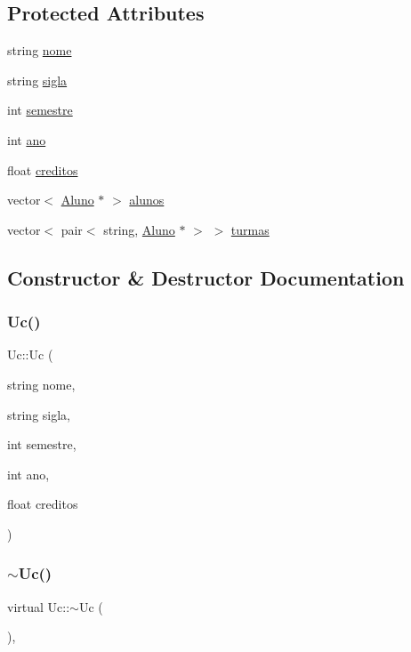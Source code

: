 \subsection*{Protected Attributes}
\begin{DoxyCompactItemize}
\item 
string \hyperlink{class_uc_af2971baa3ea283ba5fec29170de3fbe9}{nome}
\item 
string \hyperlink{class_uc_a5d6fb389c3634d6c4f4b92877e4e0e39}{sigla}
\item 
int \hyperlink{class_uc_a5e91075b035d68f536d35683c50c9bae}{semestre}
\item 
int \hyperlink{class_uc_aefaa6dc015733603451294d3e2efaa83}{ano}
\item 
float \hyperlink{class_uc_a0d64adeb7bc81560097dc7c6e9e2dff1}{creditos}
\item 
vector$<$ \hyperlink{class_aluno}{Aluno} $\ast$ $>$ \hyperlink{class_uc_a058e545b7e0dbbf16f6af64bb47361eb}{alunos}
\item 
vector$<$ pair$<$ string, \hyperlink{class_aluno}{Aluno} $\ast$ $>$ $>$ \hyperlink{class_uc_af83cbf0a6dd978ff629bfc34d5255754}{turmas}
\end{DoxyCompactItemize}


\subsection{Constructor \& Destructor Documentation}
\hypertarget{class_uc_aca20c83c3003e9279c141afed4a63d29}{}\label{class_uc_aca20c83c3003e9279c141afed4a63d29} 
\subsubsection{\texorpdfstring{Uc()}{Uc()}}
{\footnotesize\ttfamily Uc\+::\+Uc (\begin{DoxyParamCaption}\item[{string}]{nome,  }\item[{string}]{sigla,  }\item[{int}]{semestre,  }\item[{int}]{ano,  }\item[{float}]{creditos }\end{DoxyParamCaption})}

\hypertarget{class_uc_a3990e03dc5dd679cfadd02514b318d42}{}\label{class_uc_a3990e03dc5dd679cfadd02514b318d42} 
\subsubsection{\texorpdfstring{$\sim$\+Uc()}{~Uc()}}
{\footnotesize\ttfamily virtual Uc\+::$\sim$\+Uc (\begin{DoxyParamCaption}{ }\end{DoxyParamCaption})\hspace{0.3cm}{\ttfamily [inline]}, {\ttfamily [virtual]}}




